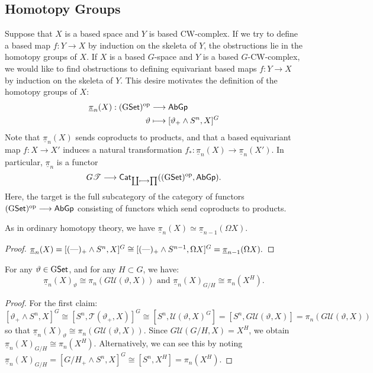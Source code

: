 \documentclass[11pt]{article}
\newcommand{\funcdef}[4]{\begin{align*}
#1&\to #2\\
#3&\mapsto#4
\end{align*}}
\begin{document}
\subsection*{Homotopy Groups}
Suppose that $X$ is a based space and $Y$ is based CW-complex. If we try to define a based map $f:Y\to X$ by induction on the skeleta of $Y$, the obstructions lie in the homotopy groups of $X$. If $X$ is a based $G$-space and $Y$ is a based $G$-CW-complex, we would like to find obstructions to defining equivariant based maps $f:Y\to X$ by induction on the skeleta of $Y$. This desire motivates the definition of the homotopy groups of $X$:
\funcdef{\underline{\pi}_n(X):(\GSet)^{\textup{op}}}{\AbGp}
{\vartheta}{[\vartheta_+\wedge S^n,X]^G}
Note that $\underline{\pi}_n(X)$ sends coproducts to products, and that a based equivariant map $f:X\to X'$ induces a natural transformation $f_*:\underline{\pi}_n(X)\to\underline{\pi}_n(X')$. In particular, $\underline{\pi}_n$ is a functor
\[G\mathscr{T}\to \Cat_{\coprod\shortmapsto\prod}((\GSet)^{\textup{op}},\AbGp).\]
Here, the target is the full subcategory of the category of functors $(\operatorname{{G\mathsf{Set}}})^{\textup{op}}\longrightarrow\operatorname{{\mathsf{AbGp}}}$ consisting of functors which send coproducts to products.
\begin{thm*}
As in ordinary homotopy theory, we have $\underline{\pi}_n(X)\simeq\underline{\pi}_{n-1}(\Omega X)$.
\end{thm*}
\begin{proof}
$\underline{\pi}_n(X)=[(\textup{---})_+\wedge S^n,X]^G\cong
[(\textup{---})_+\wedge S^{n-1},\Omega X]^G=\underline{\pi}_{n-1}(\Omega X).$
\end{proof}
\begin{thm*}
For any $\vartheta\in \operatorname{{G\mathsf{Set}}}$, and for any $H\subset G$, we have:
\[\underline{\pi}_n(X)_{\vartheta}\cong\pi_n(G\mathscr{U}(\vartheta,X))
\text{ \ and\ \ }\underline{\pi}_n(X)_{G/H}\cong\pi_n(X^H).\]
\end{thm*}
\begin{proof} For the first claim:
\[[\vartheta_+\wedge S^n,X]^G\cong[S^n,\mathscr{T}(\vartheta_+,X)]^G
\cong[S^n,\mathscr{U}(\vartheta,X)^G]
=[S^n,G\mathscr{U}(\vartheta,X)]
=\pi_n(G\mathscr{U}(\vartheta,X))\]
so that $\underline{\pi}_n(X)_{\vartheta}\cong
\pi_n(G\mathscr{U}(\vartheta,X))$. Since $G\mathscr{U}(G/H,X)=X^H$, we obtain
$\underline{\pi}_n(X)_{G/H}\cong\pi_n(X^H)$.
Alternatively, we can see this by noting
$\underline{\pi}_n(X)_{G/H}=[G/H_+\wedge S^n,X]^G\cong [S^n,X^H]=\pi_n(X^H).$
\end{proof}
\end{document}
